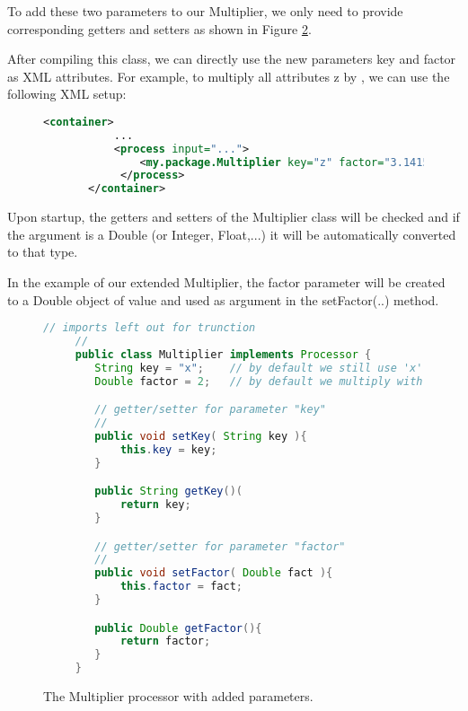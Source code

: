 To add these two parameters to our Multiplier, we only need to provide
corresponding getters and setters as shown in Figure
\ref{fig:multiplyParameters}.
        
After compiling this class, we can directly use the new parameters
{\ttfamily key} and {\ttfamily factor} as XML attributes. For example,
to multiply all attributes {\ttfamily z} by {}, we can
use the following XML setup:

\begin{figure}[h!]
  \centering
  \begin{lstlisting}[language=XML]
       <container>
           ...
           <process input="...">
               <my.package.Multiplier key="z" factor="3.1415" />
            </process>
       </container>
  \end{lstlisting}
  \caption{\label{fig:multiplyParametersXML}}
\end{figure}

Upon startup, the getters and setters of the Multiplier class will be
checked and if the argument is a Double (or Integer, Float,...) it
will be automatically converted to that type.

In the example of our extended Multiplier, the {\ttfamily factor}
parameter will be created to a Double object of value {} and
used as argument in the {\ttfamily setFactor(..)} method.


\begin{figure}[h!]
  \centering \footnotesize{
  \begin{lstlisting}[language=Java]
     // imports left out for trunction
     //
     public class Multiplier implements Processor {
        String key = "x";    // by default we still use 'x'
        Double factor = 2;   // by default we multiply with 2

        // getter/setter for parameter "key"
        //
        public void setKey( String key ){
            this.key = key;
        }

        public String getKey()(
            return key;
        }

        // getter/setter for parameter "factor"
        // 
        public void setFactor( Double fact ){
            this.factor = fact;
        }

        public Double getFactor(){
            return factor;
        }
     }
  \end{lstlisting}}
  \caption{\label{fig:multiplyParameters}The {\ttfamily Multiplier} processor with added parameters.}
\end{figure}
